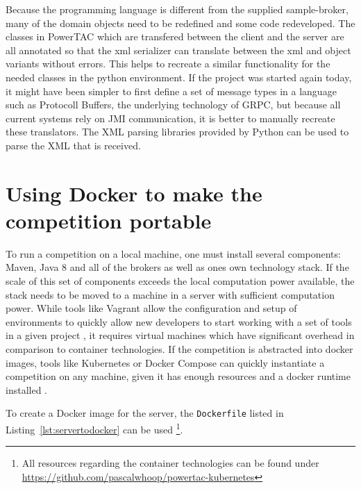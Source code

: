 Because the programming language is different from the supplied sample-broker, many of the domain objects need to be
redefined and some code redeveloped. The classes in \ac {PowerTAC} which are transfered between the client and the
server are all annotated so that the xml serializer can translate between the xml and object variants without errors.
This helps to recreate a similar functionality for the needed classes in the python environment. If the project was
started again today, it might have been simpler to first define a set of message types in a language such as Protocoll
Buffers, the underlying technology of \ac {GRPC}, but because all current systems rely on \ac {JMI} communication, it is
better to manually recreate these translators. The \ac {XML} parsing libraries provided by Python can be used to parse
the \ac {XML} that is received.


\section{Using Docker to make the competition portable}%
\label{sec:using_docker_to_make_the_competition_portable}

To run a competition on a local machine, one must install several components: Maven, Java 8 and all of the brokers as
well as ones own technology stack. If the scale of this set of components exceeds the local computation power available,
the stack needs to be moved to a machine in a server with sufficient computation power. While tools like Vagrant allow
the configuration and setup of environments to quickly allow new developers to start working with a set of tools in a
given project \citep{vagrant} , it requires virtual machines which have significant overhead in comparison to container
technologies. If the competition is abstracted into docker images, tools like Kubernetes or Docker Compose can quickly
instantiate a competition on any machine, given it has enough resources and a docker runtime installed \citep{docker}.

To create a Docker image for the server, the \texttt{Dockerfile} listed in Listing~\ref{lst:servertodocker} can be used
\footnote{All resources regarding the container technologies can be found under
\url{https://github.com/pascalwhoop/powertac-kubernetes}}.

